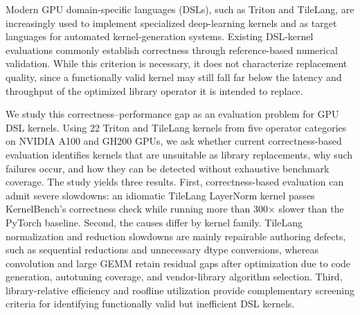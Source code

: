 Modern GPU domain-specific languages (DSLs), such as Triton and TileLang, are increasingly used to implement specialized deep-learning kernels and as target languages for automated kernel-generation systems. Existing DSL-kernel evaluations commonly establish correctness through reference-based numerical validation. While this criterion is necessary, it does not characterize replacement quality, since a functionally valid kernel may still fall far below the latency and throughput of the optimized library operator it is intended to replace. 

We study this correctness–performance gap as an evaluation problem for GPU DSL kernels. Using 22 Triton and TileLang kernels from five operator categories on NVIDIA A100 and GH200 GPUs, we ask whether current correctness-based evaluation identifies kernels that are unsuitable as library replacements, why such failures occur, and how they can be detected without exhaustive benchmark coverage. The study yields three results. {First}, correctness-based evaluation can admit severe slowdowns: an idiomatic TileLang LayerNorm kernel passes KernelBench’s correctness check while running more than 300× slower than the PyTorch baseline. {Second}, the causes differ by kernel family. TileLang normalization and reduction slowdowns are mainly repairable authoring defects, such as sequential reductions and unnecessary dtype conversions, whereas convolution and large GEMM retain residual gaps after optimization due to code generation, autotuning coverage, and vendor-library algorithm selection. {Third}, library-relative efficiency and roofline utilization provide complementary screening criteria for identifying functionally valid but inefficient DSL kernels.